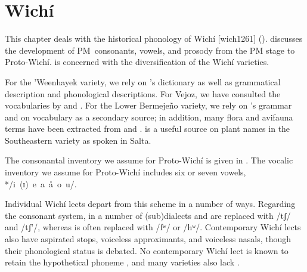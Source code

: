 \chapter{Wichí} \label{wi}

This chapter deals with the historical phonology of Wichí [wich1261] ().  discusses the development of PM~consonants, vowels, and prosody from the PM stage to Proto-Wichí.  is concerned with the diversification of the Wichí varieties.

For the ’Weenhayek variety, we rely on \citet{KC16}'s dictionary as well as  grammatical description and  phonological descriptions. For Vejoz, we have consulted the vocabularies by \citet{VU74} and \citet{MG-MELO15}. For the Lower Bermejeño variety, we rely on \citet{VN14}'s grammar and on  vocabulary as a secondary source; in addition, many flora and avifauna terms have been extracted from \citet{CS08} and \citet{CS-FL-PR-VN13}. \citet{MS14} is a useful source on plant names in the Southeastern variety as spoken in Salta.

The consonantal inventory we assume for Proto-Wichí is given in . The vocalic inventory we assume for Proto-Wichí includes six or seven vowels, */i~(ɪ)~e~a~å~o~u/.

\begin{table}
\caption{Proto-Wichí consonants}
\label{pw-inv-cons}
\end{table}

Individual Wichí lects depart from this scheme in a number of ways. Regarding the consonant system, in a number of (sub)dialects  and  are replaced with /tʃ/ and /tʃ’/, whereas  is often replaced with /fʷ/ or /hʷ/. Contemporary Wichí lects also have aspirated stops, voiceless approximants, and voiceless nasals, though their phonological status is debated. No contemporary Wichí lect is known to retain the hypothetical phoneme , and many varieties also lack .


